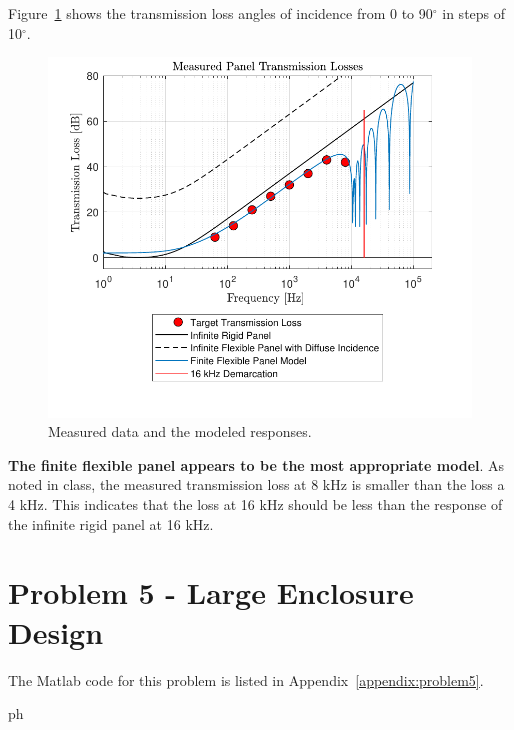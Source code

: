 {Figure~\ref{figure:q4dtransmissionLoss} shows the transmission loss angles of incidence from 0 to 90$^\circ$ in steps of 10$^\circ$.

\begin{figure}[htbp]
    \center
    \includegraphics[scale=0.9]{Q4d TL for 75 AOI.pdf}
    \vspace{-0.5cm}
    \caption{Measured data and the modeled responses.}
    \label{figure:q4dtransmissionLoss}
\end{figure}

\textbf{The finite flexible panel appears to be the most appropriate model}.  As noted in class, the measured transmission loss at 8 kHz is smaller than the loss a 4 kHz.  This indicates that the loss at 16 kHz should be less than the response of the infinite rigid panel at 16 kHz.







\newpage
\section*{Problem 5 - Large Enclosure Design}

The Matlab code for this problem is listed in Appendix~\ref{appendix:problem5}.

\vspace{0.25cm}
ph







}
